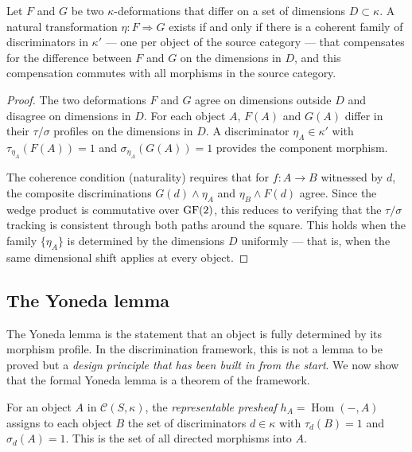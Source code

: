 \begin{proposition}
\label{prop:naturality}
Let $F$ and $G$ be two $\kappa$-deformations that differ on
a set of dimensions $D \subset \kappa$. A natural
transformation $\eta: F \Rightarrow G$ exists if and only if
there is a coherent family of discriminators in $\kappa'$
--- one per object of the source category --- that
compensates for the difference between $F$ and $G$ on the
dimensions in $D$, and this compensation commutes with
all morphisms in the source category.
\end{proposition}

\begin{proof}
The two deformations $F$ and $G$ agree on dimensions
outside $D$ and disagree on dimensions in $D$. For each
object $A$, $F(A)$ and $G(A)$ differ in their $\tau/\sigma$
profiles on the dimensions in $D$. A discriminator
$\eta_A \in \kappa'$ with $\tau_{\eta_A}(F(A)) = 1$ and
$\sigma_{\eta_A}(G(A)) = 1$ provides the component morphism.

The coherence condition (naturality) requires that for
$f: A \to B$ witnessed by $d$, the composite discriminations
$G(d) \wedge \eta_A$ and $\eta_B \wedge F(d)$ agree. Since
the wedge product is commutative over $\operatorname{GF}(2)$, this reduces
to verifying that the $\tau/\sigma$ tracking is consistent
through both paths around the square. This holds when the
family $\{\eta_A\}$ is determined by the dimensions $D$
uniformly --- that is, when the same dimensional shift
applies at every object.
\end{proof}

\subsection{The Yoneda lemma}\label{sec:yoneda}

The Yoneda lemma is the statement that an object is fully
determined by its morphism profile. In the discrimination
framework, this is not a lemma to be proved but a
\emph{design principle that has been built in from the
start}. We now show that the formal Yoneda lemma is a
theorem of the framework.

\begin{definition}\label{def:representable}
For an object $A$ in $\mathcal{C}(S,\kappa)$, the
\emph{representable presheaf} $h_A = \operatorname{Hom}(-, A)$
assigns to each object $B$ the set of discriminators
$d \in \kappa$ with $\tau_d(B) = 1$ and $\sigma_d(A) = 1$.
This is the set of all directed morphisms into $A$.
\end{definition}

